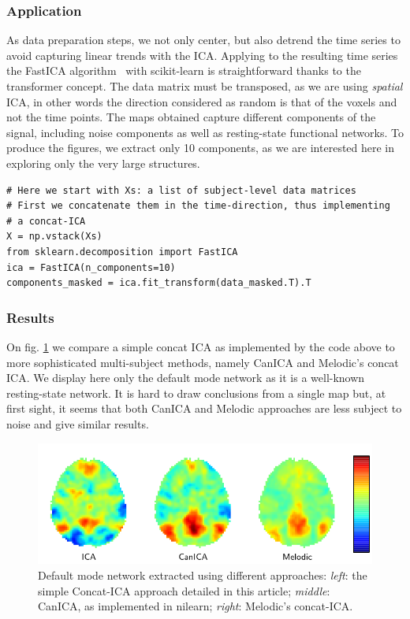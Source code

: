 \documentclass{frontiersSCNS} %
\begin{document}
\subsubsection{Application}

As data preparation steps, we not only center, but also detrend the time
series to avoid capturing linear trends with the ICA. Applying to the
resulting time series the FastICA algorithm~\citep{Hyvarinen:2000vk} with scikit-learn is
straightforward thanks to the transformer concept. The data matrix must
be transposed, as we are using \emph{spatial} ICA, in other words the
direction considered as random is that of the voxels and not the time
points. The maps obtained capture different components of the signal,
including noise components as well as resting-state functional networks.
To produce the figures, we extract only 10 components, as we are
interested here in exploring only the very large structures.

\begin{lstlisting}
# Here we start with Xs: a list of subject-level data matrices
# First we concatenate them in the time-direction, thus implementing
# a concat-ICA
X = np.vstack(Xs)
from sklearn.decomposition import FastICA
ica = FastICA(n_components=10)
components_masked = ica.fit_transform(data_masked.T).T
\end{lstlisting}

\subsubsection{Results}

On fig. \ref{fig:ica} we compare a simple concat ICA as implemented by
the code above to more sophisticated multi-subject methods, namely CanICA
and Melodic's concat ICA. We display here only the default mode network
as it is a well-known resting-state network. It is hard to draw conclusions from
a single map but, at first sight, it seems that both CanICA and Melodic
approaches are less subject to noise and give similar results.

\begin{figure}[hbtp]
  \centerline{\includegraphics[width=.9\linewidth]{scripts/ica/figure}}
  \caption{Default mode network extracted using different approaches:
\emph{left}: the simple Concat-ICA approach detailed in this article;
\emph{middle}: CanICA, as implemented in nilearn; \emph{right}: Melodic's
concat-ICA.}
  \label{fig:ica}
\end{figure}
\end{document}
